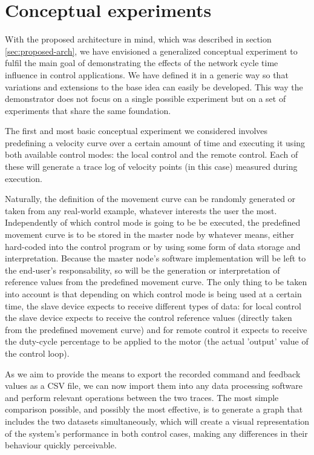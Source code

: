 \section{Conceptual experiments} \label{sec:experiments}

With the proposed architecture in mind, which was described in section \ref{sec:proposed-arch}, we have envisioned a generalized conceptual experiment to fulfil the main goal of demonstrating the effects of the network cycle time influence in control applications.
We have defined it in a generic way so that variations and extensions to the base idea can easily be developed.
This way the demonstrator does not focus on a single possible experiment but on a set of experiments that share the same foundation.

The first and most basic conceptual experiment we considered involves predefining a velocity curve over a certain amount of time and executing it using both available control modes: the local control and the remote control.
Each of these will generate a trace log of velocity points (in this case) measured during execution.

Naturally, the definition of the movement curve can be randomly generated or taken from any real-world example, whatever interests the user the most.
Independently of which control mode is going to be be executed, the predefined movement curve is to be stored in the master node by whatever means, either hard-coded into the control program or by using some form of data storage and interpretation.
Because the master node's software implementation will be left to the end-user's responsability, so will be the generation or interpretation of reference values from the predefined movement curve.
The only thing to be taken into account is that depending on which control mode is being used at a certain time, the slave device expects to receive different types of data: for local control the slave device expects to receive the control reference values (directly taken from the predefined movement curve) and for remote control it expects to receive the duty-cycle percentage to be applied to the motor (the actual 'output' value of the control loop).

As we aim to provide the means to export the recorded command and feedback values as a CSV file, we can now import them into any data processing software and perform relevant operations between the two traces.
The most simple comparison possible, and possibly the most effective, is to generate a graph that includes the two datasets simultaneously, which will create a visual representation of the system's performance in both control cases, making any differences in their behaviour quickly perceivable.



